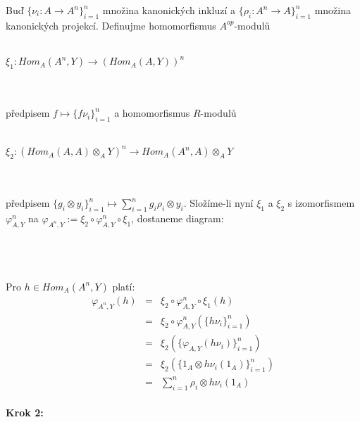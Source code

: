        Buď $\{\nu_i:A\rightarrow A^n\}_{i=1}^n$ množina kanonických inkluzí 
       a $\{\rho_i:A^n\rightarrow A\}_{i=1}^n$ množina kanonických projekcí. 
       Definujme homomorfismus $A^{op}$-modulů \\\\
       \centerline{$\xi_1:Hom_A(A^n,Y)\rightarrow (Hom_A(A,Y))^n$} \\\\
       předpisem $f\mapsto\{f\nu_i\}_{i=1}^n$
       a homomorfismus $R$-modulů \\\\
       \centerline{$\xi_2:(Hom_A(A,A)\otimes_A Y)^n\rightarrow Hom_A(A^n,A)\otimes_A 
       Y$}\\\\
       předpisem $\{g_i\otimes y_i\}_{i=1}^n\mapsto \sum_{i=1}^n g_i\rho_i\otimes y_i$. Složíme-li nyní 
       $\xi_1$ a $\xi_2$ s izomorfismem $\varphi_{A,Y}^n$ na 
       $\varphi_{A^n,Y}:=\xi_2\circ \varphi_{A,Y}^n\circ \xi_1$, dostaneme diagram:\\\\   
         \centerline{}\\\\
       Pro $h\in Hom_A(A^n,Y)$ platí:        
       \begin{eqnarray}
         \varphi_{A^n, Y}(h) &=& \xi_2\circ \varphi_{A,Y}^n\circ \xi_1(h)  \nonumber \\
         &=& \xi_2\circ \varphi_{A,Y}^n(\{h\nu_i\}_{i=1}^n) \nonumber \\
         &=& \xi_2(\{\varphi_{A,Y}(h\nu_i)\}_{i=1}^n) \nonumber \\
         &=& \xi_2(\{1_A\otimes h\nu_i(1_A)\}_{i=1}^n)  \nonumber \\
         &=& \sum_{i=1}^n \rho_i\otimes h\nu_i(1_A) \nonumber
       \end{eqnarray}
       
       \paragraph{Krok 2:} 
       
